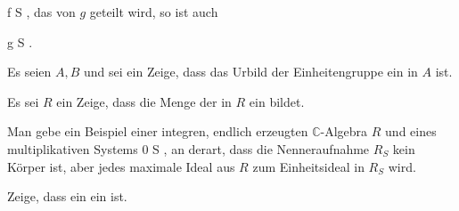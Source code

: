 \mavergleichskette
{\vergleichskette
{ f
}
{ \in }{ S
}
{  }{
}
{    }{
}
{   }{
}
}
{}{}{,}
das von $g$ geteilt wird, so ist auch

\mavergleichskette
{\vergleichskette
{ g
}
{ \in }{ S
}
{  }{
}
{    }{
}
{   }{
}
}
{}{}{.}







{}
{





Es seien $A,B$
und sei
 ein
Zeige, dass das Urbild
 der Einheitengruppe ein
in $A$ ist.





}
{} {}

{}
{





Es sei $R$ ein
Zeige, dass die Menge der
in $R$ ein
bildet.





}
{} {}

{}
{





Man gebe ein Beispiel einer integren, endlich erzeugten ${\mathbb C}$-Algebra $R$ und eines multiplikativen Systems
 {}
 {0 \not\in S} {}
 {} {} {} {,} an derart, dass die Nenneraufnahme $R_S$ kein Körper ist, aber jedes maximale Ideal aus $R$ zum Einheitsideal in $R_S$ wird.





}
{} {}

{}
{





Zeige, dass ein 
ein
ist.





}
{} {}

